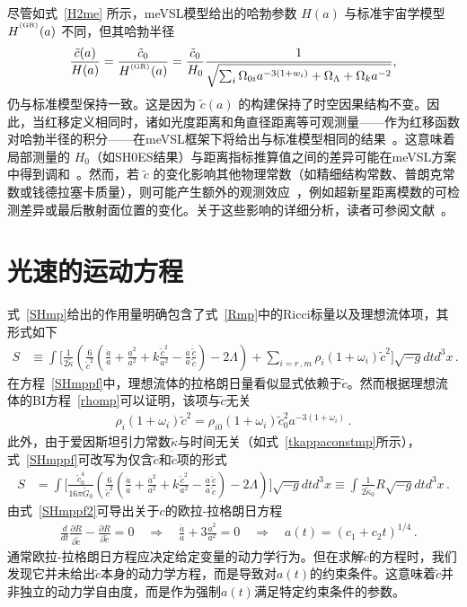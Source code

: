 \documentclass[jkps,preprint,fleqn]{revtex4}
\newcommand{\tc}{\tilde{c}}
\newcommand{\tG}{\tilde{G}}
\newcommand{\GR}{\text{GR}}
\newcommand{\tkapp}{\tilde{\kappa}}
\begin{document}
\begin{CJK*}{UTF8}{gbsn}
尽管如式~\eqref{H2me} 所示，meVSL模型给出的哈勃参数 $H(a)$ 与标准宇宙学模型 $H^{\textsuperscript{\tiny (\GR)}}(a)$ 不同，但其哈勃半径
\begin{equation}
    \frac{\tilde{c}(a)}{H(a)}  = \frac{\tc_0}{H^{\textsuperscript{\tiny (\GR)}}(a)} = \frac{\tilde{c}_0}{H_0} \frac{1}{\sqrt{\sum_i \Omega_{0i} a^{-3(1+w_i)} + \Omega_\Lambda + \Omega_k a^{-2}}},
\end{equation}
仍与标准模型保持一致。这是因为 $\tilde{c}(a)$ 的构建保持了时空因果结构不变。因此，当红移定义相同时，诸如光度距离和角直径距离等可观测量——作为红移函数对哈勃半径的积分——在meVSL框架下将给出与标准模型相同的结果~\cite{Lee:2020zts}。这意味着局部测量的 $H_0$（如SH0ES结果）与距离指标推算值之间的差异可能在meVSL方案中得到调和~\cite{Lee:2024nya}。然而，若 $\tilde{c}$ 的变化影响其他物理常数（如精细结构常数、普朗克常数或钱德拉塞卡质量），则可能产生额外的观测效应~\cite{Lee:2020zts,Lee:2021xwh}，例如超新星距离模数的可检测差异或最后散射面位置的变化。关于这些影响的详细分析，读者可参阅文献~\cite{Lee:2020zts}。
\section{光速的运动方程}
\label{sec:sol}

式~\eqref{SHmp}给出的作用量明确包含了式~\eqref{Rmp}中的Ricci标量以及理想流体项，其形式如下
\begin{align}
S &\equiv \int \Biggl[ \frac{1}{2 \tkapp} \left( \frac{6}{\tc^2} \left( \frac{\ddot{a}}{a} + \frac{\dot{a}^2}{a^2} + k \frac{\tc^2}{a^2} - \frac{\dot{a}}{a} \frac{\dot{\tc}}{ \tc} \right)  - 2 \Lambda \right) + \sum_{i=r\,,m} \rho_i (1 + \omega_i ) \tc^2 \Biggr] \sqrt{-g} dt d^3x \label{SHmppf} \,.
\end{align}
在方程~\eqref{SHmppf}中，理想流体的拉格朗日量看似显式依赖于$\tc$。然而根据理想流体的BI方程~\eqref{rhomp}可以证明，该项与$\tc$无关
\begin{align}
 \rho_i (1 + \omega_i ) \tc^2 =  \rho_{i0} (1 + \omega_i ) \tc_{0}^2 a^{-3(1 + \omega_i )}  \label{rhoi} \,.
\end{align}
此外，由于爱因斯坦引力常数$\tkapp$与时间无关（如式~\eqref{tkappaconstmp}所示），式~\eqref{SHmppf}可改写为仅含$\tc$和$\dot{\tc}$项的形式
\begin{align}
S &= \int \Biggl[ \frac{\tc_0^4}{16 \pi \tG_0} \left( \frac{6}{\tc^2} \left( \frac{\ddot{a}}{a} + \frac{\dot{a}^2}{a^2} + k \frac{\tc^2}{a^2} - \frac{\dot{a}}{a} \frac{\dot{\tc}}{ \tc} \right)  - 2 \Lambda \right)  \Biggr] \sqrt{-g} dt d^3x \equiv \int \frac{1}{2 \tkapp_0} R \sqrt{-g} dt d^3x \label{SHmppf2} \,.
\end{align}
由式~\eqref{SHmppf2}可导出关于$c$的欧拉-拉格朗日方程
\begin{align}
& \frac{d}{dt} \frac{\partial R}{\partial \dot{\tc}} - \frac{\partial R}{\partial \tc} = 0 \quad \Rightarrow \quad \frac{\ddot{a}}{a} + 3 \frac{\dot{a}^2}{a^2} = 0 \quad \Rightarrow \quad a(t) = (c_1 + c_2 t)^{1/4} \label{eomtc} \,.
\end{align}
通常欧拉-拉格朗日方程应决定给定变量的动力学行为。但在求解$\tc$的方程时，我们发现它并未给出$\tc$本身的动力学方程，而是导致对$a(t)$的约束条件。这意味着$\tc$并非独立的动力学自由度，而是作为强制$a(t)$满足特定约束条件的参数。


\end{CJK*}
\end{document}
